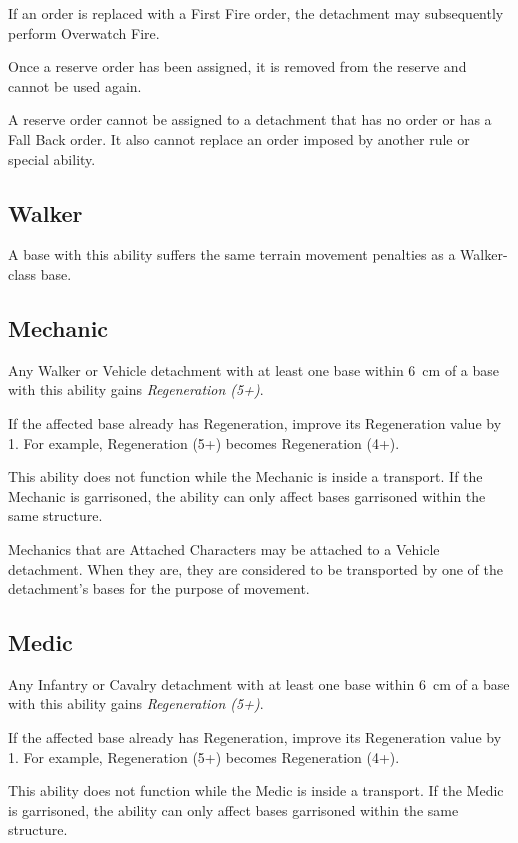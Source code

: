 If an order is replaced with a First Fire order, the detachment may subsequently perform Overwatch Fire.

Once a reserve order has been assigned, it is removed from the reserve and cannot be used again.

A reserve order cannot be assigned to a detachment that has no order or has a Fall Back order. It also cannot replace an order imposed by another rule or special ability.

\subsection{Walker}

A base with this ability suffers the same terrain movement penalties as a Walker-class base.

\subsection{Mechanic}

Any Walker or Vehicle detachment with at least one base within 6~cm of a base with this ability gains \textit{Regeneration (5+)}.

If the affected base already has Regeneration, improve its Regeneration value by 1. For example, Regeneration (5+) becomes Regeneration (4+).

This ability does not function while the Mechanic is inside a transport. If the Mechanic is garrisoned, the ability can only affect bases garrisoned within the same structure.

Mechanics that are Attached Characters may be attached to a Vehicle detachment. When they are, they are considered to be transported by one of the detachment's bases for the purpose of movement.

\subsection{Medic}

Any Infantry or Cavalry detachment with at least one base within 6~cm of a base with this ability gains \textit{Regeneration (5+)}.

If the affected base already has Regeneration, improve its Regeneration value by 1. For example, Regeneration (5+) becomes Regeneration (4+).

This ability does not function while the Medic is inside a transport. If the Medic is garrisoned, the ability can only affect bases garrisoned within the same structure.

